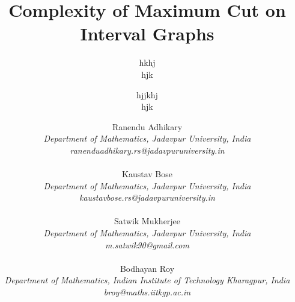 \documentclass[11pt]{article}
\author{hkhj\\hjk}
\author{hjjkhj\\hjk}
\renewenvironment{abstract}
{\small\section*
{\bfseries\noindent{\raisebox{-.15\baselineskip}{\normalsize\abstractname}}\hrulefill} 
}
\begin{document}
\title{Complexity of Maximum Cut on Interval Graphs}
    \author{
    Ranendu Adhikary\\
    \small \emph{Department of Mathematics, Jadavpur University, India}\\
    \small \emph{ranenduadhikary.rs@jadavpuruniversity.in}\\\\
    Kaustav Bose\\
    \small \emph{Department of Mathematics, Jadavpur University, India}\\
    \small \emph{kaustavbose.rs@jadavpuruniversity.in}\\\\
    Satwik Mukherjee\\
    \small \emph{Department of Mathematics, Jadavpur University, India}\\
    \small \emph{m.satwik90@gmail.com}\\\\
    Bodhayan Roy\\
    \small \emph{Department of Mathematics, Indian Institute of Technology Kharagpur, India}\\
    \small \emph{broy@maths.iitkgp.ac.in}\\\\
    }
    \date{}
    
  \maketitle
  
    
    
\begin{abstract}
% 


We resolve the longstanding open problem concerning the computational complexity of \textsc{Max Cut} on interval graphs by showing that it is NP-complete.


\end{abstract}
%
\section{Introduction}
\end{document}
